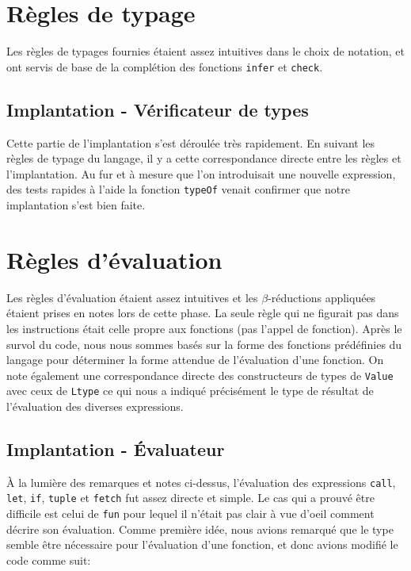 \documentclass[10pt, titlepage]{article}
\begin{document}
\section{Règles de typage}

Les règles de typages fournies étaient assez intuitives dans le choix de
notation, et ont servis de base de la complétion des fonctions \texttt{infer}
et \texttt{check}.

\subsection{Implantation - Vérificateur de types}

Cette partie de l'implantation s'est déroulée très rapidement. En suivant les
règles de typage du langage, il y a cette correspondance directe entre les
règles et l'implantation. Au fur et à mesure que l'on introduisait une nouvelle
expression, des tests rapides à l'aide la fonction \texttt{typeOf} venait
confirmer que notre implantation s'est bien faite.

\section{Règles d'évaluation}

Les règles d'évaluation étaient assez intuitives et les \(\beta\)-réductions
appliquées étaient prises en notes lors de cette phase. La seule règle qui ne
figurait pas dans les instructions était celle propre aux fonctions (pas
l'appel de fonction). Après le survol du code, nous nous sommes basés sur la
forme des fonctions prédéfinies du langage pour déterminer la forme attendue de
l'évaluation d'une fonction. On note également une correspondance directe des
constructeurs de types de \texttt{Value} avec ceux de \texttt{Ltype} ce qui
nous a indiqué précisément le type de résultat de l'évaluation des diverses
expressions.

\subsection{Implantation - Évaluateur}

À la lumière des remarques et notes ci-dessus, l'évaluation des expressions
\texttt{call}, \texttt{let}, \texttt{if}, \texttt{tuple} et \texttt{fetch}
fut assez directe et simple. Le cas qui a prouvé être difficile est celui de
\texttt{fun} pour lequel il n'était pas clair à vue d'oeil comment décrire son
évaluation. Comme première idée, nous avions remarqué que le type semble être
nécessaire pour l'évaluation d'une fonction, et donc avions modifié le code
comme suit:
\end{document}
